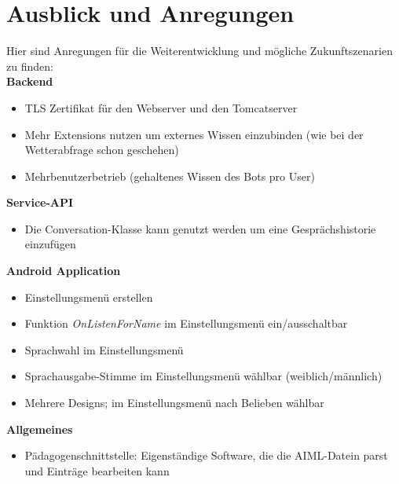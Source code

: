 \section{Ausblick und Anregungen}
	Hier sind Anregungen für die Weiterentwicklung und mögliche Zukunftszenarien zu finden:\\	
	\textbf{Backend}
	\begin{itemize}\itemsep0pt
		\item{TLS Zertifikat für den Webserver und den Tomcatserver}
		\item{Mehr Extensions nutzen um externes Wissen einzubinden (wie bei der Wetterabfrage schon geschehen)}
		\item{Mehrbenutzerbetrieb (gehaltenes Wissen des Bots pro User)}
	\end{itemize}
	\textbf{Service-API}
	\begin{itemize}\itemsep0pt
		\item{Die Conversation-Klasse kann genutzt werden um eine Gesprächshistorie einzufügen}
	\end{itemize}	
	\textbf{Android Application}
	\begin{itemize}\itemsep0pt
		\item{Einstellungsmenü erstellen}
		\item{Funktion \textit{OnListenForName} im Einstellungsmenü ein/ausschaltbar}
		\item{Sprachwahl im Einstellungsmenü}
		\item{Sprachausgabe-Stimme im Einstellungsmenü wählbar (weiblich/männlich)}
		\item{Mehrere Designs; im Einstellungsmenü nach Belieben wählbar}
	\end{itemize}	
	\textbf{Allgemeines}
	\begin{itemize}\itemsep0pt
		\item{Pädagogenschnittstelle: Eigenständige Software, die die AIML-Datein parst und Einträge bearbeiten kann}
	\end{itemize}